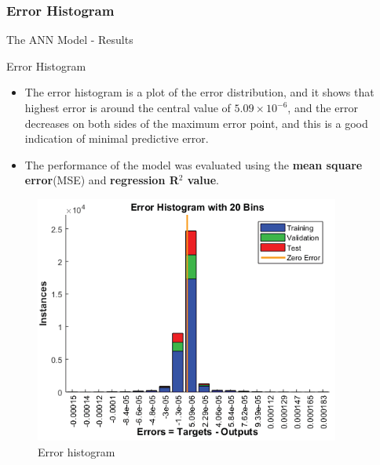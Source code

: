\documentclass{beamer}
\begin{document}
\subsubsection{Error Histogram}
\begin{frame}{The ANN Model - Results}
    \vspace{-2mm}
    \begin{block}{Error Histogram}
    \begin{itemize}
    \justifying
        \item The error histogram is a plot of the error distribution, and it shows that highest error is around the central value of $5.09 \times 10^{-6}$, and the error decreases on both sides of the maximum error point, and this is a good indication of minimal predictive error.\vspace{-1mm}
        \item The performance of the model was evaluated using the \textbf{mean square error}(MSE) and \textbf{regression R$^2$ value}.
    \end{itemize}\vspace{-3mm}
    \begin{figure}
        \centering
        \includegraphics[width=0.38\columnwidth]{Figures/Error-histogram.png}\vspace{-2mm}
        \caption{Error histogram}
        \label{Error-histogram}
    \end{figure}\vspace{-6mm}
    \end{block}
\end{frame}
\end{document}
